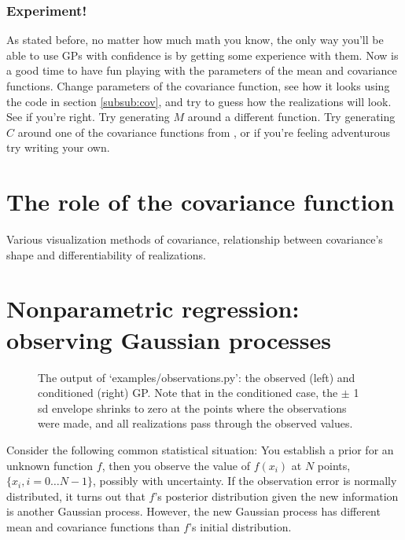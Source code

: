 \documentclass{manual}
\begin{document}
\subsubsection{Experiment!} 

As stated before, no matter how much math you know, the only way you'll be able to use GPs with confidence is by getting some experience with them. Now is a good time to have fun playing with the parameters of the mean and covariance functions. Change parameters of the covariance function, see how it looks using the code in section \ref{subsub:cov}, and try to guess how the realizations will look. See if you're right. Try generating $M$ around a different function. Try generating $C$ around one of the covariance functions from , or if you're feeling adventurous try writing your own. 



\section{The role of the covariance function}\label{sec:cov} %

Various visualization methods of covariance, relationship between covariance's shape and differentiability of realizations.



\section{Nonparametric regression: observing Gaussian processes}\label{sec:observing} %

\begin{figure}
	\centering
	\caption{The output of {\sffamily `examples/observations.py'}: the observed (left) and conditioned (right) GP. Note that in the conditioned case, the $\pm$ 1 sd envelope shrinks to zero at the points where the observations were made, and all realizations pass through the observed values.}
	\label{fig:obs}
\end{figure}

Consider the following common statistical situation: You establish a prior for an unknown function $f$, then you observe the value of $f(x_i)$ at $N$ points, $\{x_i, i=0\ldots N-1\}$, possibly with uncertainty. If the observation error is normally distributed, it turns out that $f$'s posterior distribution given the new information is another Gaussian process. However, the new Gaussian process has different mean and covariance functions than $f$'s initial distribution.
\end{document}
